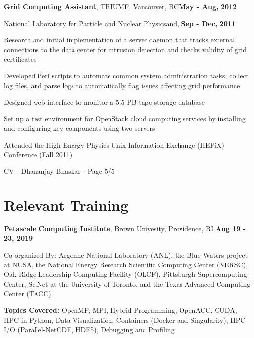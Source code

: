 \documentclass[margin,line]{res}
\newenvironment{list1}{
  \begin{list}{\ding{113}}{
      \setlength{\itemsep}{0in}
      \setlength{\parsep}{0in} \setlength{\parskip}{0in}
      \setlength{\topsep}{0in} \setlength{\partopsep}{0in}
      \setlength{\leftmargin}{0.17in}}}{\end{list}}
\newenvironment{list3}{
  \begin{list}{\textopenbullet}{
      \setlength{\itemsep}{0in}
      \setlength{\parsep}{0in} \setlength{\parskip}{0in}
      \setlength{\topsep}{0in} \setlength{\partopsep}{0in}
      \setlength{\leftmargin}{0.1in}}}{\end{list}}
\begin{document}
\begin{resume}
{\bf Grid Computing Assistant}, TRIUMF, Vancouver, BC\hfill{\bf May - Aug, 2012}\\
\vspace*{-.2cm}
\begin{list1}
\item[] National Laboratory for Particle and Nuclear Physics\hfill and, {\bf Sep - Dec, 2011}
\item[] 
\vspace*{.2cm}
\begin{list3}
\setlength\itemsep{0.5em}
\item Research and initial implementation of a server daemon that tracks external connections to the data center for intrusion detection and checks validity of grid certificates
\item Developed Perl scripts to automate common system administration tasks, collect log files, and parse logs to automatically flag issues affecting grid performance
\item Designed web interface to monitor a 5.5 PB tape storage database
\item Set up a test environment for OpenStack cloud computing services by installing and configuring key components using two servers
\item Attended the High Energy Physics Unix Information Exchange (HEPiX) Conference (Fall 2011)
\end{list3}
\end{list1}

\newpage
\begin{flushright}
CV - Dhananjay Bhaskar - Page 5/5
\end{flushright}
\vspace*{.2cm}

\section{\sc Relevant Training}

{\bf Petascale Computing Institute}, Brown Univesity, Providence, RI \hfill {\bf Aug 19 - 23, 2019}\\
\vspace*{-.2cm}
\begin{list1}
\item[] Co-organized By: Argonne National Laboratory (ANL), the Blue Waters project at NCSA, the National Energy Research Scientific Computing Center (NERSC), Oak Ridge Leadership Computing Facility (OLCF), Pittsburgh Supercomputing Center, SciNet at the University of Toronto, and the Texas Advanced Computing Center (TACC)
\vspace*{0.2cm}
\item[] {\bf Topics Covered:} OpenMP, MPI, Hybrid Programming, OpenACC, CUDA, HPC in Python, Data Visualization, Containers (Docker and Singularity), HPC I/O (Parallel-NetCDF, HDF5), Debugging and Profiling
\end{list1}



\end{resume}
\end{document}
